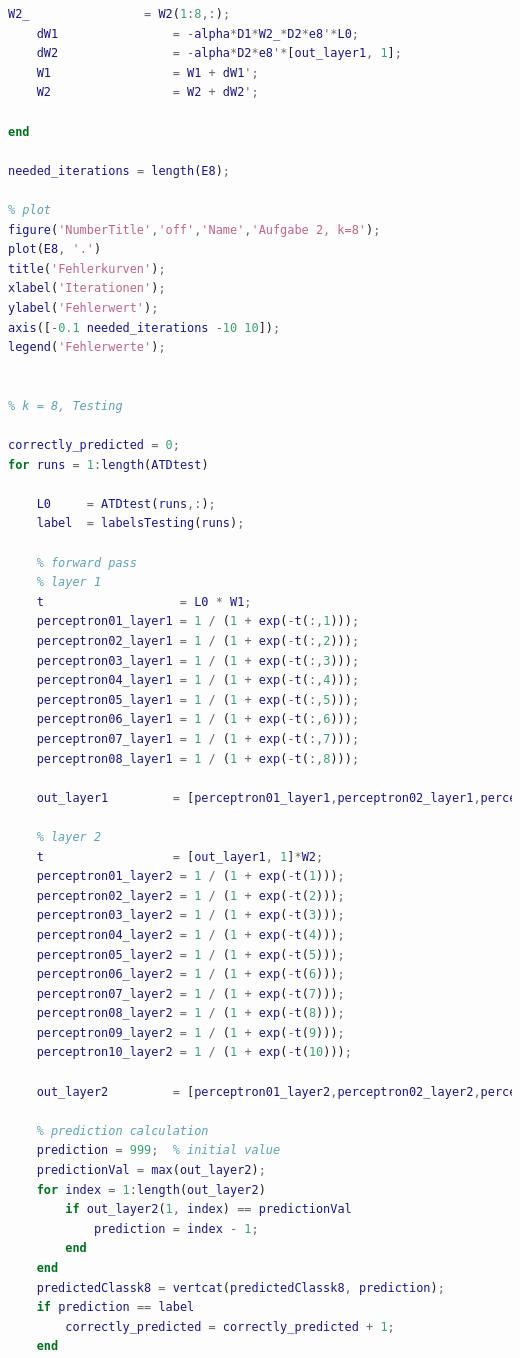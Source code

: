 \documentclass[12pt]{article}
\begin{document}
\begin{lstlisting}[language=Matlab]
    W2_                = W2(1:8,:);
    dW1                = -alpha*D1*W2_*D2*e8'*L0;
    dW2                = -alpha*D2*e8'*[out_layer1, 1];
    W1                 = W1 + dW1';
    W2                 = W2 + dW2';

end

needed_iterations = length(E8);

% plot
figure('NumberTitle','off','Name','Aufgabe 2, k=8');
plot(E8, '.')
title('Fehlerkurven');
xlabel('Iterationen');
ylabel('Fehlerwert');
axis([-0.1 needed_iterations -10 10]);
legend('Fehlerwerte');


% k = 8, Testing

correctly_predicted = 0;
for runs = 1:length(ATDtest)
    
    L0     = ATDtest(runs,:);
    label  = labelsTesting(runs);
        
    % forward pass
    % layer 1
    t                   = L0 * W1;
    perceptron01_layer1 = 1 / (1 + exp(-t(:,1)));
    perceptron02_layer1 = 1 / (1 + exp(-t(:,2)));
    perceptron03_layer1 = 1 / (1 + exp(-t(:,3)));
    perceptron04_layer1 = 1 / (1 + exp(-t(:,4)));
    perceptron05_layer1 = 1 / (1 + exp(-t(:,5)));
    perceptron06_layer1 = 1 / (1 + exp(-t(:,6)));
    perceptron07_layer1 = 1 / (1 + exp(-t(:,7)));
    perceptron08_layer1 = 1 / (1 + exp(-t(:,8)));
    
    out_layer1         = [perceptron01_layer1,perceptron02_layer1,perceptron03_layer1,perceptron04_layer1,perceptron05_layer1,perceptron06_layer1,perceptron07_layer1,perceptron08_layer1];
    
    % layer 2
    t                  = [out_layer1, 1]*W2;
    perceptron01_layer2 = 1 / (1 + exp(-t(1)));
    perceptron02_layer2 = 1 / (1 + exp(-t(2)));
    perceptron03_layer2 = 1 / (1 + exp(-t(3)));
    perceptron04_layer2 = 1 / (1 + exp(-t(4)));
    perceptron05_layer2 = 1 / (1 + exp(-t(5)));
    perceptron06_layer2 = 1 / (1 + exp(-t(6)));
    perceptron07_layer2 = 1 / (1 + exp(-t(7)));
    perceptron08_layer2 = 1 / (1 + exp(-t(8)));
    perceptron09_layer2 = 1 / (1 + exp(-t(9)));
    perceptron10_layer2 = 1 / (1 + exp(-t(10)));
    
    out_layer2         = [perceptron01_layer2,perceptron02_layer2,perceptron03_layer2,perceptron04_layer2,perceptron05_layer2,perceptron06_layer2,perceptron07_layer2,perceptron08_layer2,perceptron09_layer2,perceptron10_layer2];
    
    % prediction calculation
    prediction = 999;  % initial value
    predictionVal = max(out_layer2);
    for index = 1:length(out_layer2)
        if out_layer2(1, index) == predictionVal
            prediction = index - 1;
        end
    end
    predictedClassk8 = vertcat(predictedClassk8, prediction);
    if prediction == label
        correctly_predicted = correctly_predicted + 1;
    end


\end{lstlisting}
\end{document}
